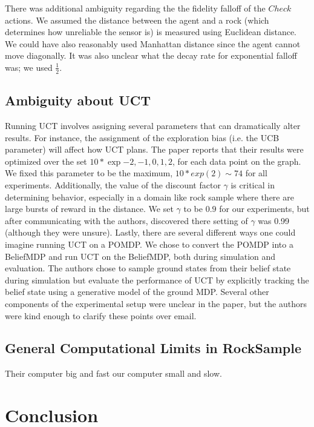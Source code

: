 \documentclass[11pt]{article} %
\begin{document}
There was additional ambiguity regarding the the fidelity falloff of the $Check$ actions. We assumed the distance between the agent and a rock (which determines how unreliable the sensor is) is measured using Euclidean distance. We could have also reasonably used Manhattan distance since the agent cannot move diagonally. It was also unclear what the decay rate for exponential falloff was; we used $\frac{1}{2}$.

\subsection{Ambiguity about UCT}

Running UCT involves assigning several parameters that can dramatically alter results. For instance, the assignment of the exploration bias (i.e. the UCB parameter) will affect how UCT plans. The paper reports that their results were optimized over the set $10 * \exp{-2, -1, 0, 1, 2}$, for each data point on the graph. We fixed this parameter to be the maximum, $10 * exp(2) \sim 74$ for all experiments. Additionally, the value of the discount factor $\gamma$ is critical in determining behavior, especially in a domain like rock sample where there are large bursts of reward in the distance. We set $\gamma$ to be $0.9$ for our experiments, but after communicating with the authors, discovered there setting of $\gamma$ was 0.99 (although they were unsure). Lastly, there are several different ways one could imagine running UCT on a POMDP. We chose to convert the POMDP into a BeliefMDP and run UCT on the BeliefMDP, both during simulation and evaluation. The authors chose to sample ground states from their belief state during simulation but evaluate the performance of UCT by explicitly tracking the belief state using a generative model of the ground MDP. Several other components of the experimental setup were unclear in the paper, but the authors were kind enough to clarify these points over email.


\subsection{General Computational Limits in RockSample}
\label{sec: compLim}
Their computer big and fast our computer small and slow.



\section{Conclusion}




\end{document}
